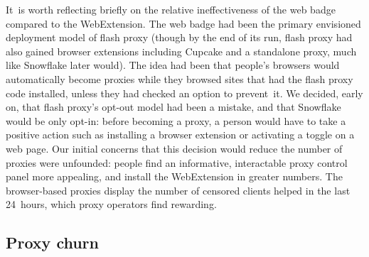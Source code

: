 \documentclass[letterpaper,twocolumn]{article}
\begin{document}

It~is worth reflecting briefly
on the relative ineffectiveness of the web badge
compared to the WebExtension.
The web badge had been the primary envisioned deployment model of flash proxy
(though by the end of its run, flash proxy had also gained
browser extensions including Cupcake
and a standalone proxy,
much like Snowflake later would).
The idea had been that people's browsers
would automatically become proxies
while they browsed sites that had the flash proxy code installed,
unless they had checked an option to prevent~it.
We decided, early on, that flash proxy's opt-out model had been a mistake,
%
and that Snowflake would be only opt-in:
before becoming a proxy, a person would have to take a positive action
such as installing a browser extension
or activating a toggle on a web page.
Our initial concerns that this decision
would reduce the number of proxies were unfounded:
people find an informative, interactable proxy control panel more appealing,
and install the WebExtension in greater numbers.
The browser-based proxies display the number of censored clients
helped in the last 24~hours,
which proxy operators find rewarding.

\subsection{Proxy churn}
\label{sec:proxy-churn}
\end{document}
